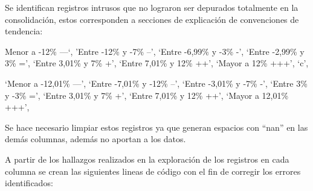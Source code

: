\documentclass[
]{book}
\begin{document}
Se identifican registros intrusos que no lograron ser depurados totalmente en la consolidación, estos corresponden a secciones de explicación de convenciones de tendencia:

Menor a -12\% ---`,
'Entre -12\% y -7\% --',
`Entre -6,99\% y -3\% -',
`Entre -2,99\% y 3\% =',
`Entre 3,01\% y 7\% +',
`Entre 7,01\% y 12\% ++',
`Mayor a 12\% +++', `c',

`Menor a -12,01\% ---',
`Entre -7,01\% y -12\% --', `Entre -3,01\% y -7\% -',
`Entre 3\% y -3\% =',
`Entre 3,01\% y 7\% +', `Entre 7,01\% y 12\% ++',
`Mayor a 12,01\% +++',

Se hace necesario limpiar estos registros ya que generan espacios con ``nan'' en las demás columnas, además no aportan a los datos.

A partir de los hallazgos realizados en la exploración de los registros en cada columna se crean las siguientes lineas de código con el fin de corregir los errores identificados:
\end{document}
